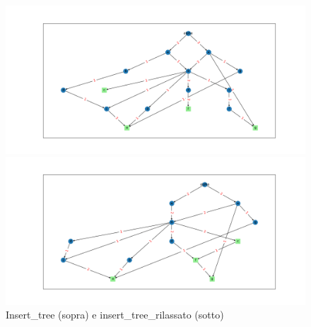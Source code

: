 \documentclass{article}
\begin{document}
\clearpage
\begin{figure}[H]
    \centering
    \includegraphics[max width=\linewidth, max height=0.9\textheight, keepaspectratio]{Resources/insert_tree.png}
    
    \includegraphics[max width=\linewidth, max height=0.9\textheight, keepaspectratio]{Resources/insert_tree_rilassato.png}
    \caption{Insert\_tree (sopra) e insert\_tree\_rilassato (sotto)}
    \label{fig:esempio}
\end{figure}
\end{document}
